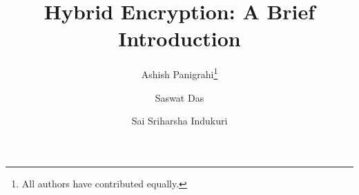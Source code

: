 \documentclass[journal]{IEEEtran}
\theoremstyle{definition}
\theoremstyle{remark}
\begin{document}
\title{Hybrid Encryption: A Brief Introduction}

\author[1]{Ashish Panigrahi\thanks{All authors have contributed equally.}}%
\author[2]{Saswat Das}
\author[3]{Sai Sriharsha Indukuri}

\maketitle








\printbibliography
\end{document}
